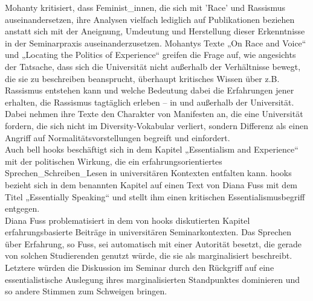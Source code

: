 Mohanty kritisiert, dass Feminist\_innen, die sich mit 'Race' und Rassismus
auseinandersetzen, ihre Analysen vielfach lediglich auf Publikationen beziehen
anstatt sich mit der Aneignung, Umdeutung und Herstellung dieser Erkenntnisse
in der Seminarpraxis auseinanderzusetzen. Mohantys Texte „On Race and
Voice“\footnotemark {} und
„Locating the Politics of Experience“\footnotemark{} greifen
die Frage auf, wie angesichts der Tatsache, dass sich die Universität nicht
außerhalb der Verhältnisse bewegt, die sie zu beschreiben beansprucht,
überhaupt kritisches Wissen über z.B. Rassismus entstehen kann und welche
Bedeutung dabei die Erfahrungen jener erhalten, die Rassismus tagtäglich
erleben – in und außerhalb der Universität. Dabei nehmen ihre Texte den
Charakter von Manifesten an, die eine Universität fordern, die sich nicht im
Diversity-Vokabular verliert, sondern Differenz als einen Angriff auf
Normalitätsvorstellungen begreift und einfordert.\\

Auch bell hooks beschäftigt sich in dem Kapitel „Essentialism and
Experience“\footnotemark{}
mit der politischen Wirkung, die ein erfahrungsorientiertes
Sprechen\_Schreiben\_Lesen in universitären Kontexten entfalten kann. hooks
bezieht sich in dem benannten Kapitel auf einen Text von Diana Fuss mit dem
Titel „Essentially Speaking“\footnotemark{} und stellt ihm einen kritischen
Essentialismusbegriff entgegen.\\

Diana Fuss problematisiert in dem von hooks diskutierten Kapitel
erfahrungsbasierte Beiträge in universitären Seminarkontexten. Das Sprechen
über Erfahrung, so Fuss, sei automatisch mit einer Autorität besetzt, die
gerade von solchen Studierenden genutzt würde, die sie als marginalisiert
beschreibt. Letztere würden die Diskussion im Seminar durch den Rückgriff auf
eine essentialistische Auslegung ihres marginalisierten Standpunktes dominieren
und so andere Stimmen zum Schweigen bringen.\footnotemark{}\\

